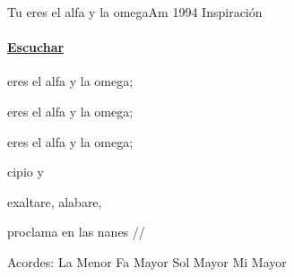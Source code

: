 \documentclass[12pt, spanish]{book}
\newcommand{\NotCCLIed}{\relax}
\begin{document}
    \begin{song}{Tu eres el alfa y la omega}{Am}
        {1994} %
        {Inspiración}
        {} %
        {} %
        \ifChordBk
        \paragraph{\mbox{}\hfill\protect\href{https://open.spotify.com/intl-es/track/1fdIe2PpAnzWFS0yIPcgZw}{Escuchar}\mbox{}\hfill}
        \fi

        \begin{SBOpGroup}
             eres el alfa y la omega;

             eres el alfa y la omega;

             eres el alfa y la omega;

            cipio y 
        \end{SBOpGroup}

        \begin{SBChorus}
             exaltare,  alabare,

             proclama  en las nanes //
        \end{SBChorus}

        \ifChordBk
        \begin{SBOpGroup}
            Acordes:
            \upchord{\Am}\qquad La Menor \hfill
            \upchord{\F}\qquad Fa Mayor \hfill\null\break
            \upchord{\G}\qquad Sol Mayor \hfill
            \upchord{\E}\qquad Mi Mayor \hfill\null\break
        \end{SBOpGroup}
        \fi
    \end{song}
\end{document}
